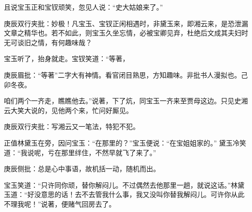 \begin{parag}
    且说宝玉正和宝钗顽笑，忽见人说：“史大姑娘来了。”\begin{note}庚辰双行夹批：妙极！凡宝玉、宝钗正闲相遇时，非黛玉来，即湘云来，是恐泄漏文章之精华也。若不如此，则宝玉久坐忘情，必被宝卿见弃，杜绝后文成其夫妇时无可谈旧之情，有何趣味哉？\end{note}宝玉听了，抬身就走。宝钗笑道：“等著，\begin{note}庚辰眉批：“等著”二字大有神情。看官闭目熟思，方知趣味。非批书人漫拟也。己卯冬夜。\end{note}咱们两个一齐走，瞧瞧他去。”说著，下了炕，同宝玉一齐来至贾母这边。只见史湘云大笑大说的，见他两个来，忙问好厮见。\begin{note}庚辰双行夹批：写湘云又一笔法，特犯不犯。\end{note}正值林黛玉在旁，因问宝玉：“在那里的？”宝玉便说：“在宝姐姐家的。” 黛玉冷笑道：“我说呢，亏在那里绊住，不然早就飞了来了。”\begin{note}庚辰侧批：总是心中事语，故机括一动，随机而出。\end{note}宝玉笑道：“只许同你顽，替你解闷儿。不过偶然去他那里一趟，就说这话。”林黛玉道：“好没意思的话！去不去管我什么事，我又没叫你替我解闷儿。可许你从此不理我呢！”说著，便赌气回房去了。
\end{parag}


